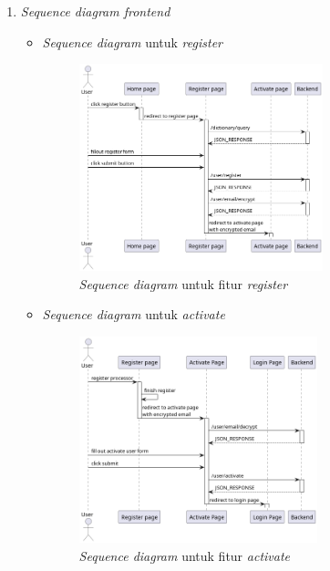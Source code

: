 \documentclass[a4paper]{article}
\begin{document}
\begin{enumerate}
    \begin{enumerate}
        \item \textit{Sequence diagram frontend}
        \begin{itemize}
            \item \textit{Sequence diagram} untuk \textit{register}
            \begin{figure}[h]
                \centering
                \includegraphics*[height=6cm]{diagram/sequence diagram/FE/1. register/register.png}
                \caption{\textit{Sequence diagram} untuk fitur \textit{register}}
            \end{figure}

            \item \textit{Sequence diagram} untuk \textit{activate}
            \begin{figure}[h]
                \centering
                \includegraphics*[height=6cm]{diagram/sequence diagram/FE/2. activate/activate.png}
                \caption{\textit{Sequence diagram} untuk fitur \textit{activate}}
            \end{figure}


\end{itemize}
\end{enumerate}
\end{enumerate}
\end{document}
